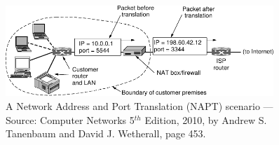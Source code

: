 \documentclass[pdftex,12pt,a4paper]{article}
\begin{document}
                \begin{figure}[tbh]
                    \centering
                    \includegraphics[width=0.9\textwidth]{figures/intro}
                    \caption{A Network Address and Port Translation (NAPT)
                        scenario --- Source: Computer Networks 5$^{th}$ Edition, 2010, by
                        Andrew S. Tanenbaum and David J. Wetherall, page 453.}
                    \label{fig:intro}
                \end{figure}
\end{document}
